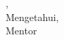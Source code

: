 \begin{flushright}
    {\city}, {\signaturedate}\\
    Mengetahui,\\
    Mentor {\jenisMBKM}\\[2cm]
    {\mentor}\\
\end{flushright}